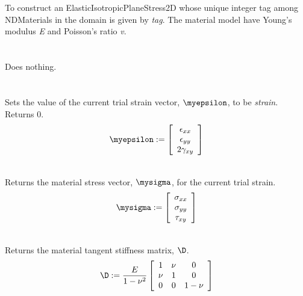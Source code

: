  \\
  \\
To construct an ElasticIsotropicPlaneStress2D whose unique integer tag
among NDMaterials in the domain is given by {\em tag}.  The material
model have Young's modulus {\em E} and Poisson's ratio {\em v}. \\

 \\
 \\
Does nothing. \\ 

 \\
  \\
Sets the value of the current trial strain vector, $\myepsilon$,
to be {\em strain}. Returns $0$. \\

\begin{displaymath}
\myepsilon := \left[
   \begin{array}{c}
       \epsilon_{xx} \\
       \epsilon_{yy}   \\
       2 \gamma_{xy}   
   \end{array} 
 \right]
\end{displaymath}

 \\
Returns the material stress vector, $\mysigma$, for the current
trial strain. \\

\begin{displaymath}
\mysigma := \left[
   \begin{array}{c}
       \sigma_{xx} \\
       \sigma_{yy}   \\
       \tau_{xy}   
   \end{array} 
 \right]
\end{displaymath}

 \\
Returns the material tangent stiffness matrix, $\D$. \\

\begin{displaymath}
\D := \frac{E}{1-\nu^2} \left[
   \begin{array}{ccc}
         1 & \nu &     0 \\
       \nu &   1 &     0 \\
         0 &   0 & 1-\nu
   \end{array} 
 \right]
\end{displaymath}

